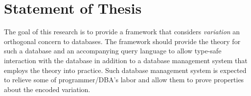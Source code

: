 \section{Statement of Thesis}
\label{sec:stmt}
The goal of this research is to provide a framework that considers \emph{variation}
an orthogonal concern to databases. The framework should provide the theory for such 
a database and an accompanying query language to allow type-safe interaction with the database
in addition to 
a database management system that employs the theory into practice.
%
Such database management system is expected to relieve 
some of programmer/DBA's labor and allow them to prove properties about the encoded 
variation.
%


